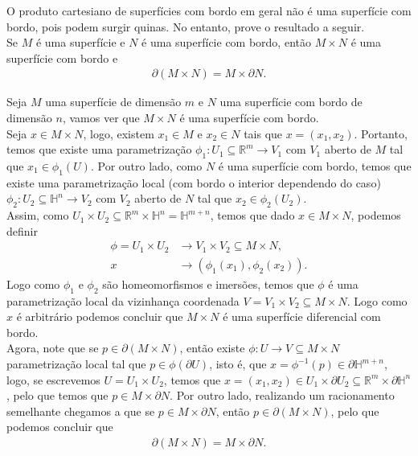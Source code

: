 \begin{homeworkProblem}[Seção 2-2]
  O produto cartesiano de superfícies com bordo em geral não é uma superfície com bordo, pois podem surgir quinas. No entanto, prove o resultado a seguir.\\
  Se $M$ é uma superfície e $N$ é uma superfície com bordo, então $M\times N$ é uma superfície com bordo e
  \begin{align*}
    \partial(M\times N)=M\times\partial N.
  \end{align*}
  \begin{solution}
    Seja $M$ uma superfície de dimensão $m$ e $N$ uma superfície com bordo de dimensão $n$, vamos ver que $M\times N$ é uma superfície com bordo.\\
    Seja $x\in M\times N$, logo, existem $x_1\in M$ e $x_2\in N$ tais que $x=(x_1,x_2)$. Portanto, temos que existe uma parametrização $\phi_1:U_1\subseteq \mathbb{R}^{m}\to V_1$ com $V_1$ aberto de $M$ tal que $x_1\in \phi_1(U)$. Por outro lado, como $N$ é uma superfície com bordo, temos que existe uma parametrização local (com bordo o interior dependendo do caso) $\phi_2:U_2\subseteq \mathbb{H}^{n}\to V_2$ com $V_2$ aberto de $N$ tal que $x_2\in\phi_2(U_2)$.\\
    Assim, como $U_1\times U_2\subseteq\mathbb{R}^{m}\times\mathbb{H}^{n}=\mathbb{H}^{m+n}$, temos que dado $x\in M\times N$, podemos definir
    \begin{align*}
      \phi=U_1\times U_2&\to V_1\times V_2\subseteq M\times N,\\
      x&\to (\phi_1(x_1),\phi_2(x_2)).
    \end{align*}
    Logo como $\phi_1$ e $\phi_2$ são homeomorfismos e imersões, temos que $\phi$ é uma parametrização local da vizinhança coordenada $V=V_1\times V_2\subseteq M\times N$. Logo como $x$ é arbitrário podemos concluir que $M\times N$ é uma superfície diferencial com bordo.\\
    
    Agora, note que se $p\in \partial(M\times N)$, então existe $\phi:U\to V\subseteq M\times N$ parametrização local tal que $p\in\phi(\partial U)$, isto é, que $x=\phi^{-1}(p)\in\partial\mathbb{H}^{m+n}$, logo, se escrevemos $U=U_1\times U_2$, temos que $x=(x_1,x_2)\in U_1\times \partial U_2\subseteq \mathbb{R}^{m}\times\partial \mathbb{H}^{n}$, pelo que temos que $p\in M\times\partial N$. Por outro lado, realizando um racionamento semelhante chegamos a que se $p\in M\times \partial N$, então $p\in\partial(M\times N)$, pelo que podemos concluir que
    \begin{align*}
      \partial(M\times N)=M\times\partial N.
    \end{align*}
  \end{solution}
\end{homeworkProblem}
